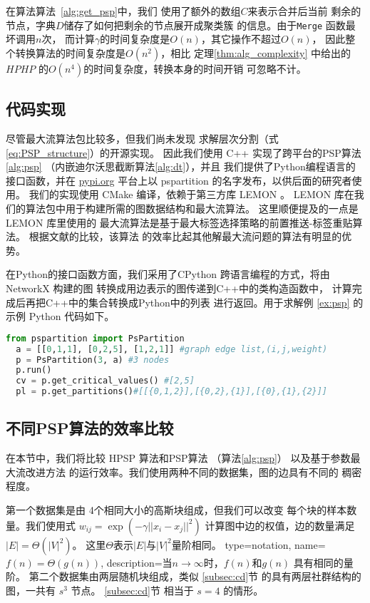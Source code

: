 在算法算法~\ref{alg:get_psp}中，我们
使用了额外的数组$C$来表示合并后当前
剩余的节点，字典$D$储存了如何把剩余的节点展开成聚类簇
的信息。由于\texttt{Merge} 函数最坏调用$n$次，
而计算$\gamma$的时间复杂度是$O(n)$，其它操作不超过$O(n)$，
因此整个转换算法的时间复杂度是$O(n^2)$，相比
定理\ref{thm:alg_complexity}
中给出的$HPHP$ 的$O(n^4)$的时间复杂度，转换本身的时间开销
可忽略不计。

\subsection{代码实现}
尽管最大流算法包比较多，但我们尚未发现
求解层次分割（式\eqref{eq:PSP_structure}）的开源实现。
因此我们使用 C++ 实现了跨平台的PSP算法\ref{alg:psp}
（内嵌迪尔沃思截断算法\ref{alg:dt}），并且
我们提供了Python编程语言的接口函数，并在 \url{pypi.org}
平台上以 pspartition
的名字发布，以供后面的研究者使用。
我们的实现使用 CMake 编译，依赖于第三方库 LEMON \cite{dezsHo2011lemon}。 
LEMON 库在我们的算法包中用于构建所需的图数据结构和最大流算法。
这里顺便提及的一点是 LEMON 库里使用的
最大流算法是基于最大标签选择策略的前置推送-标签重贴算法。
根据文献\citet{ahuja1997computational}的比较，该算法
的效率比起其他解最大流问题的算法有明显的优势。

在Python的接口函数方面，我们采用了CPython
跨语言编程的方式，将由 NetworkX \cite{SciPyProceedings_11} 构建的图
转换成用边表示的图传递到C++中的类构造函数中，
计算完成后再把C++中的集合转换成Python中的列表
进行返回。用于求解例 \ref{ex:psp}
的示例 Python 代码如下。
\begin{lstlisting}[language=Python]
  from pspartition import PsPartition
  a = [[0,1,1], [0,2,5], [1,2,1]] #graph edge list,(i,j,weight)
  p = PsPartition(3, a) #3 nodes
  p.run()
  cv = p.get_critical_values() #[2,5]
  pl = p.get_partitions()#[[{0,1,2}],[{0,2},{1}],[{0},{1},{2}]]
\end{lstlisting}

\subsection{不同PSP算法的效率比较}
在本节中，我们将比较 HPSP 算法和PSP算法
（算法\ref{alg:psp}）
以及基于参数最大流改进方法\cite{kolmogorov}
的运行效率。我们使用两种不同的数据集，图的边具有不同的
稠密程度。

第一个数据集是由
4个相同大小的高斯块组成，但我们可以改变
每个块的样本数量。我们使用式
  $w_{ij}=\exp(-\gamma ||x_i-x_j||^2)$
计算图中边的权值，边的数量满足 $|E|=\Theta(|V|^2)$。
这里$\Theta$表示$|E|$与$|V|^2$量阶相同。
{
  type=notation,
  name={$f(n)=\Theta(g(n))$},
  description={当$n\to \infty$时，$f(n)$和$g(n)$ 具有相同的量阶。}
}
第二个数据集由两层随机块组成，类似 \ref{subsec:cd}节
的具有两层社群结构的图，一共有 $s^3$ 节点。
\ref{subsec:cd}节 相当于 $s=4$ 的情形。

